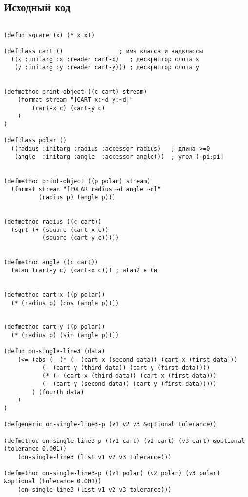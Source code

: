 \documentclass[12pt]{article}
\begin{document}
\subsection{Исходный код}
\begin{verbatim}

(defun square (x) (* x x))

(defclass cart ()                ; имя класса и надклассы
  ((x :initarg :x :reader cart-x)   ; дескриптор слота x
   (y :initarg :y :reader cart-y))) ; дескриптор слота y


(defmethod print-object ((c cart) stream)
    (format stream "[CART x:~d y:~d]"
        (cart-x c) (cart-y c)
    )
)

(defclass polar ()
  ((radius :initarg :radius :accessor radius) 	; длина >=0
   (angle  :initarg :angle  :accessor angle)))	; угол (-pi;pi]


(defmethod print-object ((p polar) stream)
  (format stream "[POLAR radius ~d angle ~d]"
          (radius p) (angle p)))


(defmethod radius ((c cart))
  (sqrt (+ (square (cart-x c))
           (square (cart-y c)))))


(defmethod angle ((c cart))
  (atan (cart-y c) (cart-x c)))	; atan2 в Си


(defmethod cart-x ((p polar))
  (* (radius p) (cos (angle p))))


(defmethod cart-y ((p polar))
  (* (radius p) (sin (angle p))))

(defun on-single-line3 (data)
	(<= (abs (- (* (- (cart-x (second data)) (cart-x (first data)))
	   	   (- (cart-y (third data)) (cart-y (first data))))
	       (* (- (cart-x (third data)) (cart-x (first data)))
	       (- (cart-y (second data)) (cart-y (first data)))))
	    ) (fourth data)
	)
)

(defgeneric on-single-line3-p (v1 v2 v3 &optional tolerance))

(defmethod on-single-line3-p ((v1 cart) (v2 cart) (v3 cart) &optional (tolerance 0.001))  
	(on-single-line3 (list v1 v2 v3 tolerance)))

(defmethod on-single-line3-p ((v1 polar) (v2 polar) (v3 polar) &optional (tolerance 0.001))  
	(on-single-line3 (list v1 v2 v3 tolerance)))

\end{verbatim}
\end{document}
